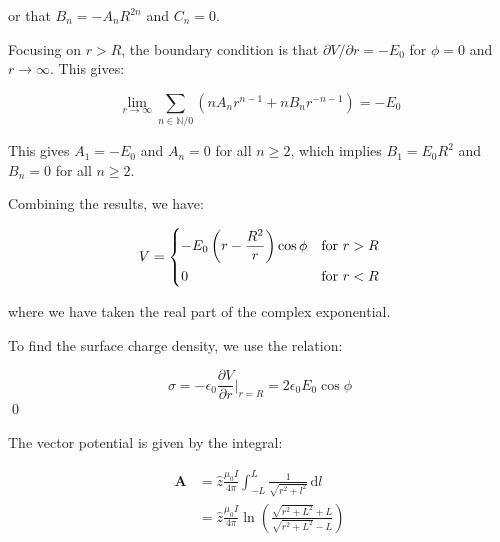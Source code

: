 \documentclass[12pt]{article}
\begin{document}
or that $B_{n} = -A_{n} R^{2n}$ and $C_{n} = 0$.

Focusing on $r > R$, the boundary condition is that $\partial V/\partial r = -E_{0}$ for $\phi = 0$ and $r \to \infty$. This gives:

\begin{equation}
    \lim_{r \to \infty} \sum_{n \in \mathbb{N}/0} \left( n A_{n} r^{n-1} + n B_{n} r^{-n-1} \right) = -E_{0}
\end{equation}



This gives $A_{1} = -E_{0}$ and $A_{n} = 0$ for all $n \ge 2$, which implies $B_{1} = E_{0} R^{2}$ and $B_{n} = 0$ for all $n \ge 2$.

Combining the results, we have:

\begin{equation}
V =
\begin{dcases}
    -E_{0} \left( r - \frac{R^{2}}{r} \right) \cos{\phi} & \text{for } r > R \\
    0 & \text{for } r < R
\end{dcases}
\end{equation}

where we have taken the real part of the complex exponential.

To find the surface charge density, we use the relation:

\begin{equation}
    \sigma = -\epsilon_{0} \frac{\partial V}{\partial r} \bigg\rvert_{r = R} = 2\epsilon_{0} E_{0} \cos{\phi}
\end{equation}
\qed



The vector potential is given by the integral:

\begin{equation}
\begin{split}
    \mathbf{A} &= \hat{z} \frac{\mu_{0} I}{4\pi} \int_{-L}^{L} \frac{1}{\sqrt{r^{2} + {l^{2}}}} \, \mathrm{d}l \\
    &= \hat{z} \frac{\mu_{0} I}{4\pi} \ln{\left( \frac{\sqrt{r^{2} + L^{2}} + L}{\sqrt{r^{2} + L^{2}} - L} \right)}
\end{split}
\end{equation}
\end{document}

